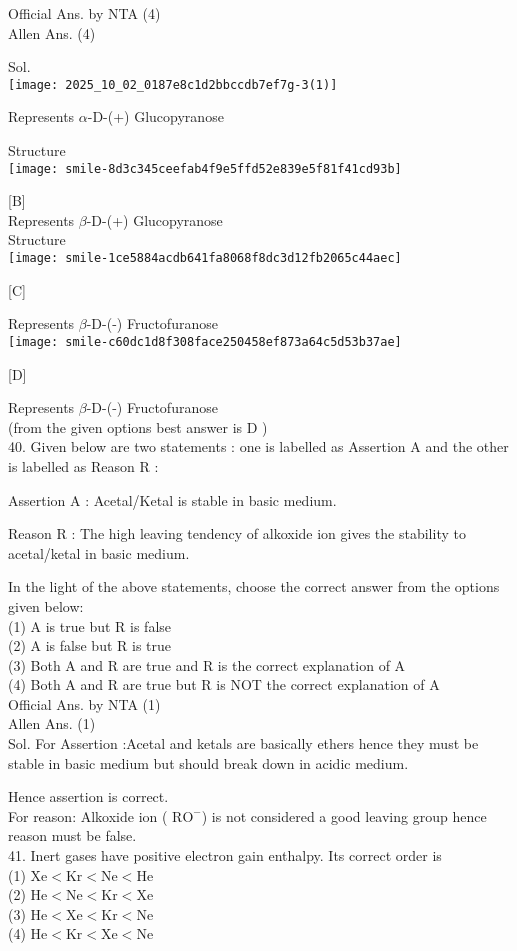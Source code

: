 \documentclass[10pt]{article}
\begin{document}
Official Ans. by NTA (4)\\
Allen Ans. (4)

Sol.\\
\texttt{[image: 2025\_10\_02\_0187e8c1d2bbccdb7ef7g-3(1)]}

Represents \(\alpha\)-D-(+) Glucopyranose

Structure\\
\texttt{[image: smile-8d3c345ceefab4f9e5ffd52e839e5f81f41cd93b]}

[B]\\
Represents \(\beta\)-D-(+) Glucopyranose\\
Structure\\
\texttt{[image: smile-1ce5884acdb641fa8068f8dc3d12fb2065c44aec]}

[C]

Represents \(\beta\)-D-(-) Fructofuranose\\
\texttt{[image: smile-c60dc1d8f308face250458ef873a64c5d53b37ae]}

[D]

Represents \(\beta\)-D-(-) Fructofuranose\\
(from the given options best answer is D )\\
40. Given below are two statements : one is labelled as Assertion A and the other is labelled as Reason R :

Assertion A : Acetal/Ketal is stable in basic medium.

Reason R : The high leaving tendency of alkoxide ion gives the stability to acetal/ketal in basic medium.

In the light of the above statements, choose the correct answer from the options given below:\\
(1) A is true but R is false\\
(2) A is false but R is true\\
(3) Both A and R are true and R is the correct explanation of A\\
(4) Both A and R are true but R is NOT the correct explanation of A\\
Official Ans. by NTA (1)\\
Allen Ans. (1)\\
Sol. For Assertion :Acetal and ketals are basically ethers hence they must be stable in basic medium but should break down in acidic medium.

Hence assertion is correct.\\
For reason: Alkoxide ion ( \(\mathrm{RO}^{-}\)) is not considered a good leaving group hence reason must be false.\\
41. Inert gases have positive electron gain enthalpy. Its correct order is\\
(1) \(\mathrm{Xe}<\mathrm{Kr}<\mathrm{Ne}<\mathrm{He}\)\\
(2) \(\mathrm{He}<\mathrm{Ne}<\mathrm{Kr}<\mathrm{Xe}\)\\
(3) \(\mathrm{He}<\mathrm{Xe}<\mathrm{Kr}<\mathrm{Ne}\)\\
(4) \(\mathrm{He}<\mathrm{Kr}<\mathrm{Xe}<\mathrm{Ne}\)
\end{document}
